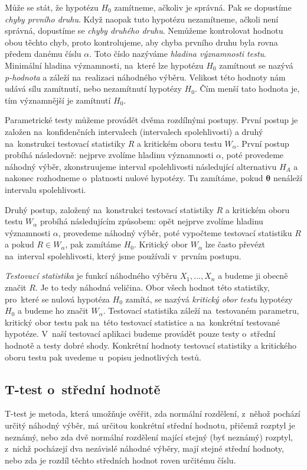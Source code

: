\documentclass[thesis=B,czech]{FITthesis}[2012/06/26]
\begin{document}
Může se stát, že hypotézu $H_{0}$ zamítneme, ačkoliv je správná. Pak se dopustíme \textit{chyby prvního druhu}. Když naopak tuto hypotézu nezamítneme, ačkoli není správná, dopustíme se \textit{chyby druhého druhu}. Nemůžeme kontrolovat hodnotu obou těchto chyb, proto kontrolujeme, aby chyba prvního druhu byla rovna předem danému číslu $\alpha$. Toto číslo nazýváme \textit{hladina významnosti testu}. Minimální hladina významnosti, na~které lze hypotézu $H_{0}$ zamítnout se nazývá \textit{p-hodnota} a záleží na~realizaci náhodného výběru. Velikost této hodnoty nám udává sílu zamítnutí, nebo nezamítnutí hypotézy $H_{0}$. Čím menší tato hodnota je, tím významnější je zamítnutí $H_{0}$.

Parametrické testy můžeme provádět dvěma rozdílnými postupy. První postup je založen na~konfidenčních intervalech (intervalech spolehlivosti) a druhý na~konstrukci testovací statistiky $R$ a kritickém oboru testu $W_{\alpha}$. První postup probíhá následovně: nejprve zvolíme hladinu významnosti $\alpha$, poté provedeme náhodný výběr, zkonstruujeme interval spolehlivosti následující alternativu $H_{A}$ a nakonec rozhodneme o~platnosti nulové hypotézy. Tu zamítáme, pokud $\boldsymbol{\theta}$ nenáleží intervalu spolehlivosti. 

Druhý postup, založený na~konstrukci testovací statistiky $R$ a kritickém oboru testu $W_{\alpha}$ probíhá následujícím způsobem: opět nejprve zvolíme hladinu významnosti $\alpha$, provedeme náhodný výběr, poté vypočteme testovací statistiku $R$ a pokud $R\in W_{\alpha}$, pak zamítáme $H_{0}$. Kritický obor $W_{\alpha}$ lze často převézt na~interval spolehlivosti, který jsme používali v~prvním postupu. 

\textit{Testovací statistika} je funkcí náhodného výběru $X_{1},...,X_{n}$ a budeme ji obecně značit $R$. Je to tedy náhodná veličina. Obor všech hodnot této statistiky, pro~které se nulová hypotéza $H_{0}$ zamítá, se nazývá \textit{kritický obor testu} hypotézy $H_{0}$ a budeme ho značit $W_{\alpha}$. Testovací statistika záleží na~testovaném parametru, kritický obor testu pak na~této testovací statistice a na~konkrétní testované hypotéze. V~naší testovací aplikaci budeme provádět pouze testy o~střední hodnotě a testy dobré shody. Konkrétní hodnoty testovací statistiky a kritického oboru testu pak uvedeme u~popisu jednotlivých testů.

\subsection{T-test o~střední hodnotě}
T-test je metoda, která umožňuje ověřit, zda normální rozdělení, z~něhož pochází určitý náhodný výběr, má určitou konkrétní střední hodnotu, přičemž rozptyl je neznámý, nebo zda dvě normální rozdělení mající stejný (byť neznámý) rozptyl, z~nichž pocházejí dva nezávislé náhodné výběry, mají stejné střední hodnoty, nebo zda je rozdíl těchto středních hodnot roven určitému číslu.
\end{document}
